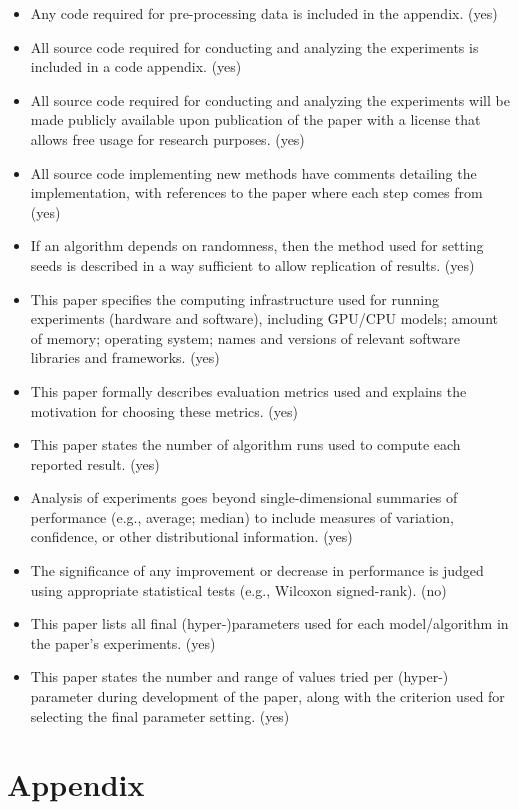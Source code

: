 \documentclass[letterpaper]{article} %
\begin{document}
\begin{itemize}
    \item Any code required for pre-processing data is included in the appendix. (yes)
    \item All source code required for conducting and analyzing the experiments is included in a code appendix. (yes)
    \item All source code required for conducting and analyzing the experiments will be made publicly available upon publication of the paper with a license that allows free usage for research purposes. (yes)
    \item All source code implementing new methods have comments detailing the implementation, with references to the paper where each step comes from (yes)
    \item If an algorithm depends on randomness, then the method used for setting seeds is described in a way sufficient to allow replication of results. (yes)
    \item This paper specifies the computing infrastructure used for running experiments (hardware and software), including GPU/CPU models; amount of memory; operating system; names and versions of relevant software libraries and frameworks. (yes)
    \item This paper formally describes evaluation metrics used and explains the motivation for choosing these metrics. (yes)
    \item This paper states the number of algorithm runs used to compute each reported result. (yes)
    \item Analysis of experiments goes beyond single-dimensional summaries of performance (e.g., average; median) to include measures of variation, confidence, or other distributional information. (yes)
    \item The significance of any improvement or decrease in performance is judged using appropriate statistical tests (e.g., Wilcoxon signed-rank). (no)
    \item This paper lists all final (hyper-)parameters used for each model/algorithm in the paper’s experiments. (yes)
    \item This paper states the number and range of values tried per (hyper-) parameter during development of the paper, along with the criterion used for selecting the final parameter setting. (yes)
\end{itemize}

\newpage
\section{Appendix}
\end{document}
